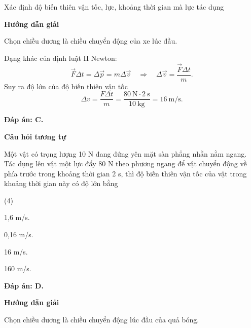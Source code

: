 \begin{dang}{Xác định độ biến thiên vận tốc, lực, khoảng thời gian mà lực tác dụng}
	{	\begin{center}
			\textbf{Hướng dẫn giải}
		\end{center}
		
		Chọn chiều dương là chiều chuyển động của xe lúc đầu.
		
		Dạng khác của định luật II Newton:
		\begin{equation*}
			\vec{F}\Delta t= \Delta \vec{p} =m \Delta \vec{v} \quad\Rightarrow\quad \Delta \vec{v} = \dfrac{\vec{F} \Delta t}{m}.
		\end{equation*}
		Suy ra độ lớn của độ biến thiên vận tốc 
		\begin{equation*}
			\Delta  v=\dfrac{F\Delta t}{m}=\dfrac{\SI{80}{\newton}\cdot\SI{2}{\second}}{\SI{10}{\kilogram}}= 16\ \text{m/s}.
		\end{equation*}
		
		\textbf{Đáp án: C.}
		
		\begin{center}
			\textbf{Câu hỏi tương tự}
		\end{center}
		
		Một vật có trọng lượng 10 N đang đứng yên mặt sàn phẳng nhẵn nằm ngang. Tác dụng lên vật một lực đẩy 80 N theo phương ngang để vật chuyển động về phía trước trong khoảng thời gian 2 s, thì độ biến thiên vận tốc của vật trong khoảng thời gian này có độ lớn bằng
		\begin{mcq}(4)
			\item 1,6 m/s.
			\item 0,16 m/s.
			\item 16 m/s.
			\item 160 m/s.
		\end{mcq}
		
		\textbf{Đáp án: D.}
	}
	{\begin{center}
			\textbf{Hướng dẫn giải}
		\end{center}
		Chọn chiều dương là chiều chuyển động lúc đầu của quả bóng. 
		
}
\end{dang}
